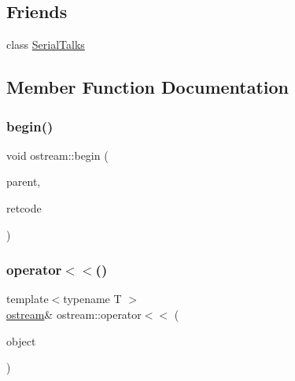\subsection*{Friends}
\begin{DoxyCompactItemize}
\item 
class \hyperlink{classostream_a4cd752c675c62b44d1424308b66cf98c}{Serial\+Talks}
\end{DoxyCompactItemize}


\subsection{Member Function Documentation}
\mbox{\label{classostream_a55897fe17941a52bd6b192fc71282bc2}} 
\subsubsection{\texorpdfstring{begin()}{begin()}}
{\footnotesize\ttfamily void ostream\+::begin (\begin{DoxyParamCaption}\item[{\hyperlink{class_serial_talks}{Serial\+Talks} \&}]{parent,  }\item[{long}]{retcode }\end{DoxyParamCaption})\hspace{0.3cm}{\ttfamily [protected]}}

\mbox{\label{classostream_a9cb0d22f302c0f6617759ec2865f7704}} 
\subsubsection{\texorpdfstring{operator$<$$<$()}{operator<<()}}
{\footnotesize\ttfamily template$<$typename T $>$ \\
\hyperlink{classostream}{ostream}\& ostream\+::operator$<$$<$ (\begin{DoxyParamCaption}\item[{const T \&}]{object }\end{DoxyParamCaption})\hspace{0.3cm}{\ttfamily [inline]}}

\mbox{\label{classostream_a6f8b701c1cb3f122bf13074034520295}} 
